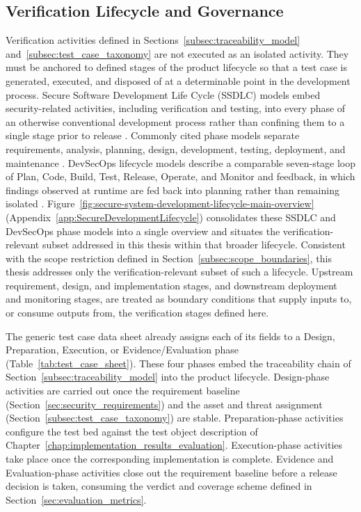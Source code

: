 \subsection{Verification Lifecycle and Governance}
\label{subsec:verification_lifecycle_governance}


Verification activities defined in Sections~\ref{subsec:traceability_model} and~\ref{subsec:test_case_taxonomy} are not executed as an isolated activity. They must be anchored to defined stages of the product lifecycle so that a test case is generated, executed, and disposed of at a determinable point in the development process. Secure Software Development Life Cycle (SSDLC) models embed security-related activities, including verification and testing, into every phase of an otherwise conventional development process rather than confining them to a single stage prior to release \cite{ibm_ssdlc_2025} \cite{geeksforgeeks_ssdlc_2026}. Commonly cited phase models separate requirements, analysis, planning, design, development, testing, deployment, and maintenance \cite{ibm_ssdlc_2025}. DevSecOps lifecycle models describe a comparable seven-stage loop of Plan, Code, Build, Test, Release, Operate, and Monitor and feedback, in which findings observed at runtime are fed back into planning rather than remaining isolated \cite{cloudaware_devsecops_lifecycle_2026}. Figure~\ref{fig:secure-system-development-lifecycle-main-overview} (Appendix~\ref{app:SecureDevelopmentLifecycle}) consolidates these SSDLC and DevSecOps phase models into a single overview and situates the verification-relevant subset addressed in this thesis within that broader lifecycle. Consistent with the scope restriction defined in Section~\ref{subsec:scope_boundaries}, this thesis addresses only the verification-relevant subset of such a lifecycle. Upstream requirement, design, and implementation stages, and downstream deployment and monitoring stages, are treated as boundary conditions that supply inputs to, or consume outputs from, the verification stages defined here.

The generic test case data sheet already assigns each of its fields to a Design, Preparation, Execution, or Evidence/Evaluation phase (Table~\ref{tab:test_case_sheet}). These four phases embed the traceability chain of Section~\ref{subsec:traceability_model} into the product lifecycle. Design-phase activities are carried out once the requirement baseline (Section~\ref{sec:security_requirements}) and the asset and threat assignment (Section~\ref{subsec:test_case_taxonomy}) are stable. Preparation-phase activities configure the test bed against the test object description of Chapter~\ref{chap:implementation_results_evaluation}. Execution-phase activities take place once the corresponding implementation is complete. Evidence and Evaluation-phase activities close out the requirement baseline before a release decision is taken, consuming the verdict and coverage scheme defined in Section~\ref{sec:evaluation_metrics}.


